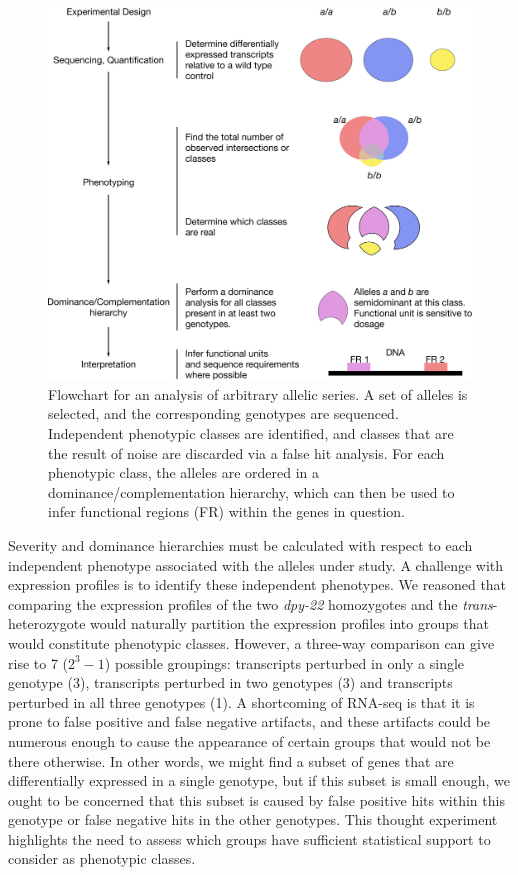 \documentclass[9pt,twocolumn,twoside]{gsajnl}
\newcommand{\gene}[1]{\mbox{\emph{#1}}}
\newcommand{\dpy}[1]{\gene{dpy-22#1}}
\begin{document}
\begin{figure}
 \centering{}
 \includegraphics[width=\textwidth]{../figs/flowchart.pdf}
 \caption{
         Flowchart for an analysis of arbitrary allelic series. A set of alleles
         is selected, and the corresponding genotypes are sequenced. Independent
         phenotypic classes are identified, and classes that are the result of
         noise are discarded via a false hit analysis. For each phenotypic
         class, the alleles are ordered in a dominance/complementation
         hierarchy, which can then be used to infer functional regions (FR)
         within the genes in question.
         }
\label{fig:flowchart}
\end{figure}

Severity and dominance hierarchies must be calculated with respect to each
independent phenotype associated with the alleles under study. A challenge with
expression profiles is to identify these independent phenotypes. We reasoned
that comparing the expression profiles of the two \dpy{} homozygotes and the
\emph{trans}-heterozygote would naturally partition the expression profiles into
groups that would constitute phenotypic classes. However, a three-way comparison
can give rise to 7 ($2^3-1$) possible groupings: transcripts perturbed in only a
single genotype (3), transcripts perturbed in two genotypes (3) and transcripts
perturbed in all three genotypes (1). A shortcoming of RNA-seq is that it is
prone to false positive and false negative artifacts, and these artifacts could
be numerous enough to cause the appearance of certain groups that would not
be there otherwise. In other words, we might find a subset of genes that are
differentially expressed in a single genotype, but if this subset is small
enough, we ought to be concerned that this subset is caused by false positive
hits within this genotype or false negative hits in the other genotypes. This
thought experiment highlights the need to assess which groups have sufficient
statistical support to consider as phenotypic classes.
\end{document}
